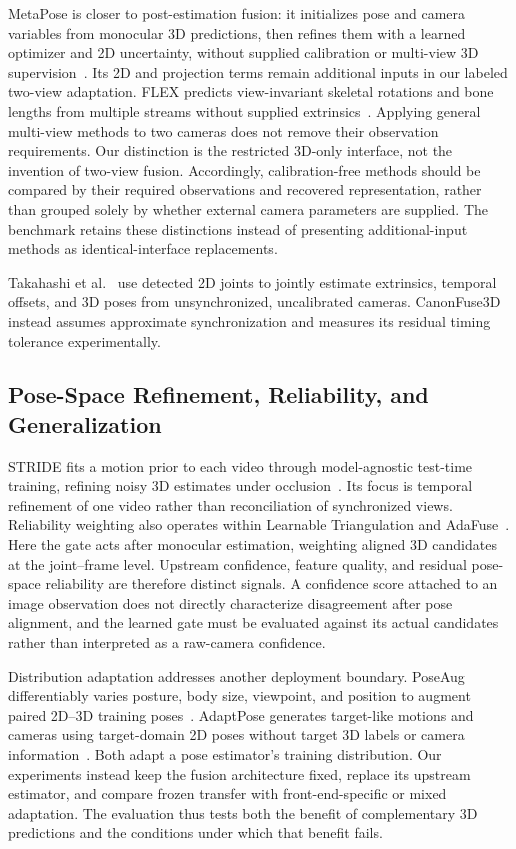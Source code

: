 \documentclass[preprint,12pt]{elsarticle}
\begin{document}
MetaPose is closer to post-estimation fusion: it initializes pose and camera variables from monocular 3D predictions, then refines them with a learned optimizer and 2D uncertainty, without supplied calibration or multi-view 3D supervision~\cite{usman2022metapose}. Its 2D and projection terms remain additional inputs in our labeled two-view adaptation. FLEX predicts view-invariant skeletal rotations and bone lengths from multiple streams without supplied extrinsics~\cite{gordon2022flex}. Applying general multi-view methods to two cameras does not remove their observation requirements. Our distinction is the restricted 3D-only interface, not the invention of two-view fusion. Accordingly, calibration-free methods should be compared by their required observations and recovered representation, rather than grouped solely by whether external camera parameters are supplied. The benchmark retains these distinctions instead of presenting additional-input methods as identical-interface replacements.

Takahashi et al.~\cite{takahashi2018human} use detected 2D joints to jointly estimate extrinsics, temporal offsets, and 3D poses from unsynchronized, uncalibrated cameras. CanonFuse3D instead assumes approximate synchronization and measures its residual timing tolerance experimentally.

\subsection{Pose-Space Refinement, Reliability, and Generalization}
STRIDE fits a motion prior to each video through model-agnostic test-time training, refining noisy 3D estimates under occlusion~\cite{lal2025stride}. Its focus is temporal refinement of one video rather than reconciliation of synchronized views. Reliability weighting also operates within Learnable Triangulation and AdaFuse~\cite{iskakov2019learnable,zhang2021adafuse}. Here the gate acts after monocular estimation, weighting aligned 3D candidates at the joint--frame level. Upstream confidence, feature quality, and residual pose-space reliability are therefore distinct signals. A confidence score attached to an image observation does not directly characterize disagreement after pose alignment, and the learned gate must be evaluated against its actual candidates rather than interpreted as a raw-camera confidence.

Distribution adaptation addresses another deployment boundary. PoseAug differentiably varies posture, body size, viewpoint, and position to augment paired 2D--3D training poses~\cite{gong2021poseaug}. AdaptPose generates target-like motions and cameras using target-domain 2D poses without target 3D labels or camera information~\cite{gholami2022adaptpose}. Both adapt a pose estimator's training distribution. Our experiments instead keep the fusion architecture fixed, replace its upstream estimator, and compare frozen transfer with front-end-specific or mixed adaptation. The evaluation thus tests both the benefit of complementary 3D predictions and the conditions under which that benefit fails.
\end{document}
